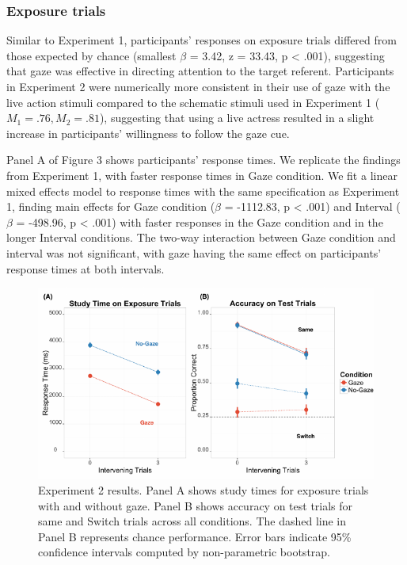 \documentclass[authoryear, review]{elsarticle}
\newenvironment{CodeChunk}{}{}
\begin{document}
\subsubsection{Exposure trials}\label{exposure-trials-1}

Similar to Experiment 1, participants' responses on exposure trials
differed from those expected by chance (smallest \(\beta\) = 3.42, z =
33.43, p \textless{} .001), suggesting that gaze was effective in
directing attention to the target referent. Participants in Experiment 2
were numerically more consistent in their use of gaze with the live
action stimuli compared to the schematic stimuli used in Experiment 1
(\(M_1 = .76, M_2 = .81\)), suggesting that using a live actress
resulted in a slight increase in participants' willingness to follow the
gaze cue.

Panel A of Figure 3 shows participants' response times. We replicate the
findings from Experiment 1, with faster response times in Gaze
condition. We fit a linear mixed effects model to response times with
the same specification as Experiment 1, finding main effects for Gaze
condition (\(\beta\) = -1112.83, p \textless{} .001) and Interval
(\(\beta\) = -498.96, p \textless{} .001) with faster responses in the
Gaze condition and in the longer Interval conditions. The two-way
interaction between Gaze condition and interval was not significant,
with gaze having the same effect on participants' response times at both
intervals.

\begin{CodeChunk}
\begin{figure}[tb]
\includegraphics{figs/expt2-plot-1} \caption[Experiment 2 results]{Experiment 2 results. Panel A shows study times for exposure trials with and without gaze. Panel B shows accuracy on test trials for same and Switch trials across all conditions. The dashed line in Panel B represents chance performance. Error bars indicate 95\% confidence intervals computed by non-parametric bootstrap.}\label{fig:expt2-plot}
\end{figure}
\end{CodeChunk}
\end{document}
